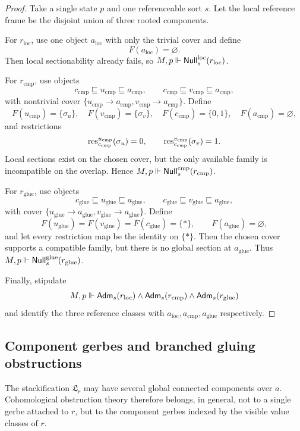 \begin{proof}
Take a single state $p$ and one referenceable sort $s$. Let the local reference frame be the disjoint union of three rooted components.

For $r_{\mathrm{loc}}$, use one object $a_{\mathrm{loc}}$ with only the trivial cover and define
\[
F(a_{\mathrm{loc}})=\varnothing.
\]
Then local sectionability already fails, so $M,p\Vdash \mathsf{Null}^{\mathrm{loc}}_s(r_{\mathrm{loc}})$.

For $r_{\mathrm{cmp}}$, use objects
\[
c_{\mathrm{cmp}}\sqsubseteq u_{\mathrm{cmp}}\sqsubseteq a_{\mathrm{cmp}},
\qquad
c_{\mathrm{cmp}}\sqsubseteq v_{\mathrm{cmp}}\sqsubseteq a_{\mathrm{cmp}},
\]
with nontrivial cover $\{u_{\mathrm{cmp}}\to a_{\mathrm{cmp}},v_{\mathrm{cmp}}\to a_{\mathrm{cmp}}\}$. Define
\[
F(u_{\mathrm{cmp}})=\{\sigma_u\},\quad
F(v_{\mathrm{cmp}})=\{\sigma_v\},\quad
F(c_{\mathrm{cmp}})=\{0,1\},\quad
F(a_{\mathrm{cmp}})=\varnothing,
\]
and restrictions
\[
\mathrm{res}_{c_{\mathrm{cmp}}}^{u_{\mathrm{cmp}}}(\sigma_u)=0,
\qquad
\mathrm{res}_{c_{\mathrm{cmp}}}^{v_{\mathrm{cmp}}}(\sigma_v)=1.
\]
Local sections exist on the chosen cover, but the only available family is incompatible on the overlap. Hence $M,p\Vdash \mathsf{Null}^{\mathrm{cmp}}_s(r_{\mathrm{cmp}})$.

For $r_{\mathrm{glue}}$, use objects
\[
c_{\mathrm{glue}}\sqsubseteq u_{\mathrm{glue}}\sqsubseteq a_{\mathrm{glue}},
\qquad
c_{\mathrm{glue}}\sqsubseteq v_{\mathrm{glue}}\sqsubseteq a_{\mathrm{glue}},
\]
with cover $\{u_{\mathrm{glue}}\to a_{\mathrm{glue}},v_{\mathrm{glue}}\to a_{\mathrm{glue}}\}$. Define
\[
F(u_{\mathrm{glue}})=F(v_{\mathrm{glue}})=F(c_{\mathrm{glue}})=\{*\},
\qquad
F(a_{\mathrm{glue}})=\varnothing,
\]
and let every restriction map be the identity on $\{*\}$. Then the chosen cover supports a compatible family, but there is no global section at $a_{\mathrm{glue}}$. Thus $M,p\Vdash \mathsf{Null}^{\mathrm{glue}}_s(r_{\mathrm{glue}})$.

Finally, stipulate
\[
M,p\Vdash \mathsf{Adm}_s(r_{\mathrm{loc}})\land \mathsf{Adm}_s(r_{\mathrm{cmp}})\land \mathsf{Adm}_s(r_{\mathrm{glue}})
\]
and identify the three reference classes with $a_{\mathrm{loc}},a_{\mathrm{cmp}},a_{\mathrm{glue}}$ respectively.
\end{proof}

\subsection{Component gerbes and branched gluing obstructions}

The stackification $\mathfrak L_r$ may have several global connected components over $a$. Cohomological obstruction theory therefore belongs, in general, not to a single gerbe attached to $r$, but to the component gerbes indexed by the visible value classes of $r$.

